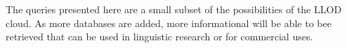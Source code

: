 The queries presented here are a small subset of the possibilities of the LLOD cloud. As more databases are added, more informational will be able to bee retrieved that can be used in linguistic research or for commercial uses. 

